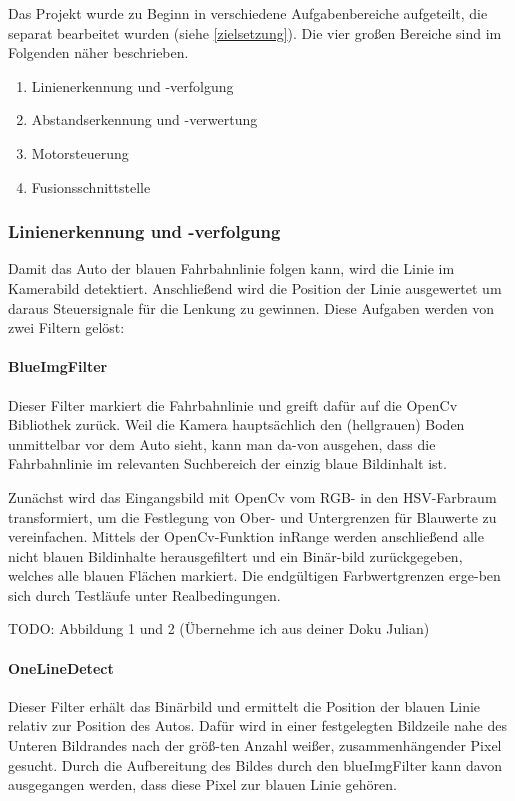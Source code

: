 \documentclass[12pt, a4paper]{scrartcl}
\begin{document}
Das Projekt wurde zu Beginn in verschiedene Aufgabenbereiche aufgeteilt, die separat bearbeitet wurden (siehe \autoref{zielsetzung}). Die vier großen Bereiche sind im Folgenden näher beschrieben.

\begin{enumerate}
	\item Linienerkennung und -verfolgung
	\item Abstandserkennung und -verwertung
	\item Motorsteuerung
	\item Fusionsschnittstelle
\end{enumerate}


\subsubsection{Linienerkennung und -verfolgung}
Damit das Auto der blauen Fahrbahnlinie folgen kann, wird die Linie im Kamerabild detektiert. Anschließend wird die Position der Linie ausgewertet um daraus Steuersignale für die Lenkung zu gewinnen. Diese Aufgaben werden von zwei Filtern gelöst:

\paragraph{BlueImgFilter}
Dieser Filter markiert die Fahrbahnlinie und greift dafür auf die OpenCv Bibliothek zurück. Weil die Kamera hauptsächlich den (hellgrauen) Boden unmittelbar vor dem Auto sieht, kann man da-von ausgehen, dass die Fahrbahnlinie im relevanten Suchbereich der einzig blaue Bildinhalt ist.

Zunächst wird das Eingangsbild mit OpenCv vom RGB- in den HSV-Farbraum transformiert, um die Festlegung von Ober- und Untergrenzen für Blauwerte zu vereinfachen. Mittels der OpenCv-Funktion inRange werden anschließend alle nicht blauen Bildinhalte herausgefiltert und ein Binär-bild zurückgegeben, welches alle blauen Flächen markiert. Die endgültigen Farbwertgrenzen erge-ben sich durch Testläufe unter Realbedingungen.    

TODO: Abbildung 1 und 2 (Übernehme ich aus deiner Doku Julian)


\paragraph{OneLineDetect}
Dieser Filter erhält das Binärbild und ermittelt die Position der blauen Linie relativ zur Position des Autos. Dafür wird in einer festgelegten Bildzeile nahe des Unteren Bildrandes nach der größ-ten Anzahl weißer, zusammenhängender Pixel gesucht. Durch die Aufbereitung des Bildes durch den blueImgFilter kann davon ausgegangen werden, dass diese Pixel zur blauen Linie gehören. 
\end{document}

